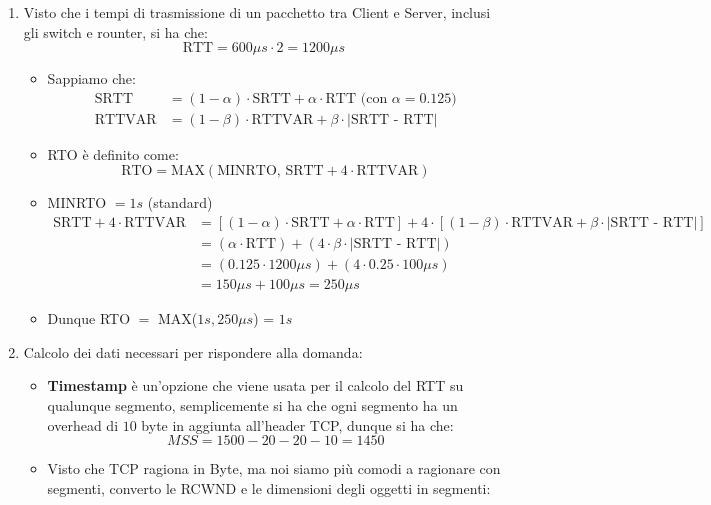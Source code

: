 \documentclass[10pt]{article}
\begin{document}
	\begin{enumerate}
		\item Visto che i tempi di trasmissione di un pacchetto tra Client e Server, inclusi gli switch e rounter, si ha che: 
		$$ \textrm{RTT} = 600 \mu s \cdot 2 = 1200 \mu s $$
		\begin{itemize}
			\item Sappiamo che:
			\begin{equation*}
				\begin{split}
					\textrm{SRTT} &= (1 - \alpha) \cdot \textrm{SRTT} + \alpha \cdot \textrm{RTT (con } \alpha = 0.125 \textrm{)}\\
					\textrm{RTTVAR} &= (1 - \beta) \cdot \textrm{RTTVAR} + \beta \cdot |\textrm{SRTT - RTT}| 
				\end{split}
			\end{equation*}
		\item RTO è definito come: $$\textrm{RTO} = \textrm{MAX}(\textrm{MINRTO, SRTT} + 4 \cdot \textrm{RTTVAR})$$
		\item MINRTO $= 1s$ (standard)
		\begin{equation*}
				\begin{split}
					\textrm{SRTT} + 4 \cdot \textrm{RTTVAR}
					&= \left[(1 - \alpha) \cdot \textrm{SRTT} + \alpha \cdot \textrm{RTT}\right] + 4 \cdot \left[(1 - \beta) \cdot \textrm{RTTVAR} + \beta \cdot |\textrm{SRTT - RTT}|\right] \\
					&=  (\alpha \cdot \textrm{RTT}) + (4 \cdot \beta \cdot |\textrm{SRTT - RTT}|) \\
					&= (0.125 \cdot 1200 \mu s) + (4 \cdot 0.25 \cdot 100 \mu s) \\
					&= 150 \mu s + 100 \mu s = 250 \mu s
				\end{split}
			\end{equation*}
		\item Dunque RTO $=$ MAX($1s, 250 \mu s$) = $1s$
		\end{itemize}	
	\item Calcolo dei dati necessari per rispondere alla domanda:			
		\begin{itemize}
			\item  \textbf{Timestamp} è un'opzione che viene usata per il calcolo del RTT su qualunque segmento, semplicemente si ha che ogni segmento ha un overhead di $10$ byte in aggiunta all'header TCP, dunque si ha che: $$MSS = 1500 - 20 - 20 - 10 = 1450$$
		\item Visto che TCP ragiona in Byte, ma noi siamo più comodi a ragionare con segmenti, converto le RCWND e le dimensioni degli oggetti in segmenti:

\end{itemize}
\end{enumerate}
\end{document}
